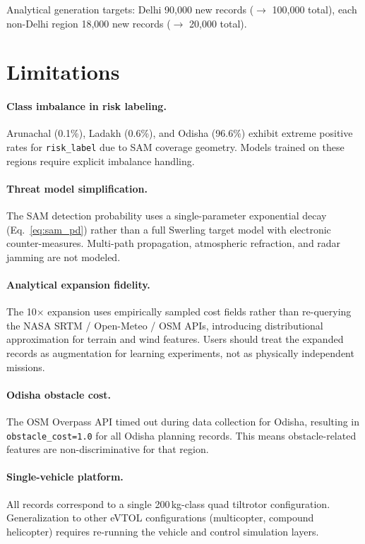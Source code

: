\documentclass{article}
\begin{document}
Analytical generation targets:
Delhi 90{,}000 new records ($\to$ 100{,}000 total),
each non-Delhi region 18{,}000 new records ($\to$ 20{,}000 total).

\section{Limitations}
\label{sec:limitations}

\paragraph{Class imbalance in risk labeling.}
Arunachal (0.1\%), Ladakh (0.6\%), and Odisha (96.6\%) exhibit extreme
positive rates for \texttt{risk\_label} due to SAM coverage geometry.
Models trained on these regions require explicit imbalance handling.

\paragraph{Threat model simplification.}
The SAM detection probability uses a single-parameter exponential decay
(Eq.~\ref{eq:sam_pd}) rather than a full Swerling target model with
electronic counter-measures. Multi-path propagation, atmospheric refraction,
and radar jamming are not modeled.

\paragraph{Analytical expansion fidelity.}
The 10$\times$ expansion uses empirically sampled cost fields rather than
re-querying the NASA SRTM / Open-Meteo / OSM APIs, introducing distributional
approximation for terrain and wind features. Users should treat the expanded
records as augmentation for learning experiments, not as physically independent
missions.

\paragraph{Odisha obstacle cost.}
The OSM Overpass API timed out during data collection for Odisha, resulting
in \texttt{obstacle\_cost=1.0} for all Odisha planning records. This means
obstacle-related features are non-discriminative for that region.

\paragraph{Single-vehicle platform.}
All records correspond to a single 200\,kg-class quad tiltrotor configuration.
Generalization to other eVTOL configurations (multicopter, compound helicopter)
requires re-running the vehicle and control simulation layers.
\end{document}
